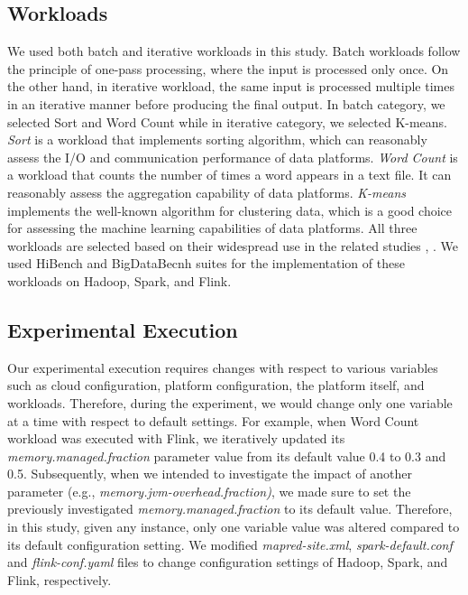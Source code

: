 \documentclass[3p]{elsarticle}
\begin{document}
\subsection{Workloads} We used both batch and iterative workloads in this study. Batch workloads follow the principle of one-pass processing, where the input is processed only once. On the other hand, in iterative workload, the same input is processed multiple times in an iterative manner before producing the final output. In batch category, we selected Sort and Word Count while in iterative category, we selected K-means. \textit{Sort} is a workload that implements sorting algorithm, which can reasonably assess the I/O and communication performance of data platforms. \textit{Word Count} is a workload that counts the number of times a word appears in a text file. It can reasonably assess the aggregation capability of data platforms. \textit{K-means} implements the well-known algorithm for clustering data, which is a good choice for assessing the machine learning capabilities of data platforms. All three workloads are selected based on their widespread use in the related studies \cite{herodotou2020survey}, \cite{costa2021survey}. We used HiBench \cite{huang2010hibench} and BigDataBecnh \cite{wang2014bigdatabench} suites for the implementation of these workloads on Hadoop, Spark, and Flink.

\subsection{Experimental Execution} Our experimental execution requires changes with respect to various variables such as cloud configuration, platform configuration, the platform itself, and workloads. Therefore, during the experiment, we would change only one variable at a time with respect to default settings. For example, when Word Count workload was executed with Flink, we iteratively updated its \textit{memory.managed.fraction} parameter value from its default value 0.4 to 0.3 and 0.5. Subsequently, when we intended to investigate the impact of another parameter (e.g., \textit{memory.jvm-overhead.fraction)}, we made sure to set the previously investigated \textit{memory.managed.fraction} to its default value. Therefore, in this study, given any instance, only one variable value was altered compared to its default configuration setting. We modified \textit{mapred-site.xml}, \textit{spark-default.conf} and \textit{flink-conf.yaml} files to change configuration settings of Hadoop, Spark, and Flink, respectively. 
\end{document}
